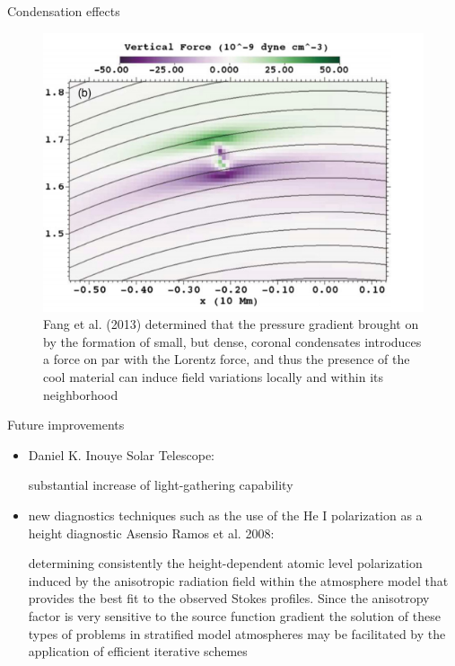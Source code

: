 \documentclass{beamer}
\begin{document}
\begin{frame}{Condensation effects}

\begin{figure}[H]
    \includegraphics[scale=0.4]{fang1.png}
    \caption{
Fang et al. (2013) determined that the
pressure gradient brought on by the formation of small, but
dense, coronal condensates introduces a force on par with the
Lorentz force, and thus the presence of the cool material can
induce field variations locally and within its neighborhood
    } 
\end{figure}

\end{frame}


\begin{frame}{Future improvements}
\begin{itemize}
\item  Daniel K. Inouye Solar Telescope:

substantial increase of light-gathering capability
\item 
new diagnostics techniques such as the use of the He I polarization as a
height diagnostic Asensio Ramos et al. 2008: 

determining consistently the height-dependent atomic level polarization induced by the anisotropic radiation field
within the atmosphere model that provides the best fit to the observed
Stokes profiles. Since the anisotropy factor is very sensitive
to the source function gradient  the solution of these types of problems in stratified model
atmospheres may be facilitated by the application of efficient iterative
schemes
\end{itemize}


\end{frame}
\end{document}
